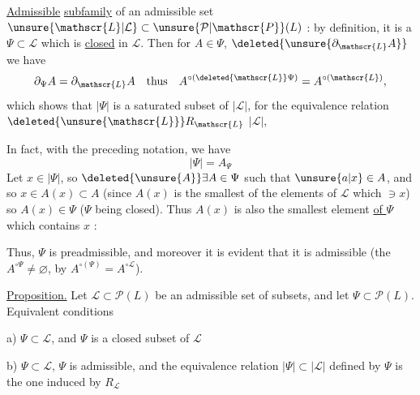  \uline{Admissible} \uline{subfamily}  of an admissible set $\unsure{\mathscr{L}|\mathcal{L}}\subset\unsure{\mathcal{P}|\mathscr{P}}(L)$ : by definition, it is a $\Psi\subset\mathscr{L}$ which is \uline{closed} in $\mathscr{L}$. Then for $A\in\Psi$, $\deleted{\unsure{\partial_{\mathscr{L}}A}}$ we have
\[
 \partial_{\Psi}A=\partial_{\mathscr{L}}A\quad\text{thus}\quad
 A^{\circ(\deleted{\mathscr{L}}\Psi)}=A^{\circ(\mathscr{L})},
\]
which shows that $|\Psi|$ is a saturated subset of $|\mathscr{L}|$, for the equivalence relation $\deleted{\unsure{\mathscr{L}}}R_{\mathscr{L}}$  $|\mathscr{L}|$,

In fact, with the preceding notation, we have
\[
 |\Psi|=A_\Psi
\]
 Let $x\in|\Psi|$, so $\deleted{\unsure{A}}\exists A\in\Psi$ such that $\unsure{a|x}\in A$,  and so $x\in A(x)\subset A$ (since $A(x)$ is the smallest of the elements of $\mathscr{L}$ which $\ni x$) so $A(x)\in\Psi$ ($\Psi$ being closed). Thus $A(x)$ is also the smallest element \uline{of $\Psi$} which contains $x$ :

 Thus, $\Psi$ is preadmissible, and moreover it is evident that it is admissible (the $A^{\circ\Psi}\ne\varnothing$, by $A^{\circ(\Psi)}=A^{\circ\mathscr{L}}$).

\uline{Proposition.} Let $\mathscr{L}\subset\mathcal{P}(L)$ be an admissible set of subsets, and let $\Psi\subset\mathcal{P}(L)$. Equivalent conditions

a) $\Psi\subset\mathscr{L}$, and $\Psi$ is a closed subset of $\mathscr{L}$

b) $\Psi\subset\mathscr{L}$, $\Psi$ is admissible,  and the equivalence relation   $|\Psi|\subset|\mathscr{L}|$ defined by $\Psi$ is the one induced by $R_{\mathscr{L}}$

